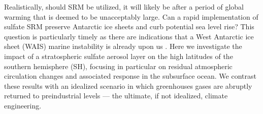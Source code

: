 \documentclass[draft,grl]{AGUTeX}  %
\begin{document}
\begin{article}

Realistically, should SRM be utilized, it will likely be after a period of global warming that is deemed to be unacceptably large. Can a rapid implementation of sulfate SRM preserve Antarctic ice sheets and curb potential sea level rise? This question is particularly timely as there are indications that a West Antarctic ice sheet (WAIS) marine instability is already upon us \citep{favier14,rignot14}. Here we investigate the impact of a stratospheric sulfate aerosol layer on the high latitudes of the southern hemisphere (SH), focusing in particular on residual atmospheric circulation changes and associated response in the subsurface ocean. We contrast these results with an idealized scenario in which greenhouses gases are abruptly returned to preindustrial levels --- the ultimate, if not idealized, climate engineering. 


\end{article}
\end{document}
